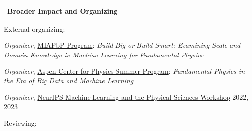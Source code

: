 \documentclass[letterpaper,11pt]{article}
\newenvironment{packed_itemize}{
\begin{itemize}[label=\raisebox{0.25ex}{\tiny$\bullet$}]
  \setlength{\itemsep}{4.2pt}
  \setlength{\parskip}{0pt}
  \setlength{\parsep}{0pt}}{\end{itemize}
}
\begin{document}

 
\noindent
\begin{tabular*}{\textwidth}{l@{\extracolsep{\fill}}}
\large {\sc \Large{Broader Impact and Organizing}}\\
\hline
\end{tabular*}\vspace{3.5mm}

\noindent
External organizing:

\begin{packed_itemize}
\item \begin{minipage}[t]{.84\linewidth}
      \emph{Organizer}, \href{https://www.munich-iapbp.de/}{MIAPbP Program}: 
      \emph{Build Big or Build Smart: Examining Scale and Domain Knowledge in Machine Learning for Fundamental Physics}
      \end{minipage}%
      \hfill%
      \begin{minipage}[t]{.16\linewidth}
      \vspace{0pt} 
      \end{minipage}\vspace{1.5mm}
\item \begin{minipage}[t]{.84\linewidth}
      \emph{Organizer}, \href{https://aspenphys.org/physicists/summer/program/currentworkshops.html}{Aspen Center for Physics Summer Program}: 
      \emph{Fundamental Physics in the Era of Big Data and Machine Learning}
      \end{minipage}%
      \hfill%
      \begin{minipage}[t]{.16\linewidth}
      \vspace{0pt} 
      \end{minipage}\vspace{1.5mm}
  \item \emph{Organizer}, \href{https://ml4physicalsciences.github.io/}{NeurIPS Machine Learning and the Physical Sciences Workshop} \hfill 2022, 2023
  \end{packed_itemize}
  \noindent
Reviewing:
\end{document}
